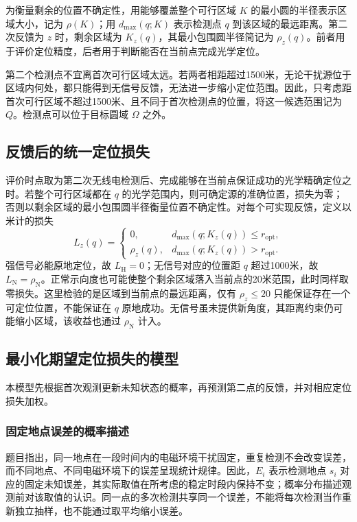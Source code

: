 \documentclass[UTF8,a4paper,zihao=-4,fontset=none]{ctexart}
\begin{document}
为衡量剩余的位置不确定性，用能够覆盖整个可行区域 \(K\) 的最小圆的半径表示区域大小，记为 \(\rho(K)\)；用 \(d_{\max}(q;K)\) 表示检测点 \(q\) 到该区域的最远距离。第二次反馈为 \(z\) 时，剩余区域为 \(K_z(q)\)，其最小包围圆半径简记为 \(\rho_z(q)\)。前者用于评价定位精度，后者用于判断能否在当前点完成光学定位。

第二个检测点不宜离首次可行区域太远。若两者相距超过1500米，无论干扰源位于区域内何处，都只能得到无信号反馈，无法进一步缩小定位范围。因此，只考虑距首次可行区域不超过1500米、且不同于首次检测点的位置，将这一候选范围记为 \(Q\)。检测点可以位于目标圆域 \(\Omega\) 之外。

\subsection{反馈后的统一定位损失}

评价时点取为第二次无线电检测后、完成能够在当前点保证成功的光学精确定位之时。若整个可行区域都在 \(q\) 的光学范围内，则可确定源的准确位置，损失为零；否则以剩余区域的最小包围圆半径衡量位置不确定性。对每个可实现反馈，定义以米计的损失
\begin{equation}
 L_z(q)=
 \begin{cases}
 0,&d_{\max}(q;K_z(q))\le r_{\mathrm{opt}},\\
 \rho_z(q),&d_{\max}(q;K_z(q))>r_{\mathrm{opt}}.
 \end{cases}
\label{eq:q2-pair-loss}
\end{equation}
强信号必能原地定位，故 \(L_{\mathrm H}=0\)；无信号对应的位置距 \(q\) 超过1000米，故 \(L_{\mathrm N}=\rho_{\mathrm N}\)。正常示向度也可能使整个剩余区域落入当前点的20米范围，此时同样取零损失。这里检验的是区域到当前点的最远距离，仅有 \(\rho_z\le20\) 只能保证存在一个可定位位置，不能保证在 \(q\) 原地成功。无信号虽未提供新角度，其距离约束仍可能缩小区域，该收益也通过 \(\rho_{\mathrm N}\) 计入。

\subsection{最小化期望定位损失的模型}

本模型先根据首次观测更新未知状态的概率，再预测第二点的反馈，并对相应定位损失加权。

\subsubsection{固定地点误差的概率描述}

题目指出，同一地点在一段时间内的电磁环境干扰固定，重复检测不会改变误差，而不同地点、不同电磁环境下的误差呈现统计规律。因此，\(E_i\) 表示检测地点 \(s_i\) 对应的固定未知误差，其实际取值在所考虑的稳定时段内保持不变；概率分布描述观测前对该取值的认识。同一点的多次检测共享同一个误差，不能将每次检测当作重新独立抽样，也不能通过取平均缩小误差。
\end{document}
